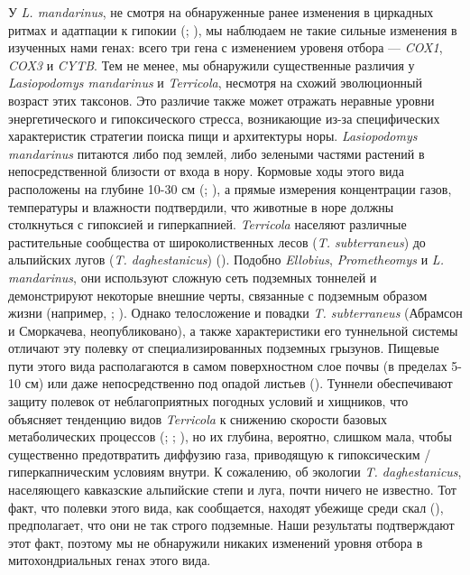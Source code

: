 У \textit{L. mandarinus}, не смотря на обнаруженные ранее изменения в циркадных ритмах и адатпации к гипокии (\cite{Sun2018}; \cite{Dong2020}), мы наблюдаем не такие сильные изменения в изученных нами генах: всего три гена с изменением уровеня отбора --- \textit{COX1}, \textit{COX3} и \textit{CYTB}. Тем не менее, мы обнаружили существенные различия у \textit{Lasiopodomys mandarinus} и \textit{Terricola}, несмотря на схожий эволюционный возраст этих таксонов. Это различие также может отражать неравные уровни энергетического и гипоксического стресса, возникающие из-за специфических характеристик стратегии поиска пищи и архитектуры норы. \textit{Lasiopodomys mandarinus} питаются либо под землей, либо зелеными частями растений в непосредственной близости от входа в нору. Кормовые ходы этого вида расположены на глубине 10-30 см (\cite{Smorkatcheva1990}; \cite{Hong2019}), а прямые измерения концентрации газов, температуры и влажности подтвердили, что животные в норе должны столкнуться с гипоксией и гиперкапнией. \textit{Terricola} населяют различные растительные сообщества от широколиственных лесов (\textit{T. subterraneus}) до альпийских лугов (\textit{T. daghestanicus}) (\cite{Aulagnier2018}). Подобно \textit{Ellobius}, \textit{Prometheomys} и \textit{L. mandarinus}, они используют сложную сеть подземных тоннелей и демонстрируют некоторые внешние черты, связанные с подземным образом жизни (например, \cite{Aulagnier2018}; \cite{Mironov2020}). Однако телосложение и повадки \textit{T. subterraneus} (Абрамсон и Сморкачева, неопубликовано), а также характеристики его туннельной системы отличают эту полевку от специализированных подземных грызунов. Пищевые пути этого вида располагаются в самом поверхностном слое почвы (в пределах 5-10 см) или даже непосредственно под опадой листьев (\cite{Mironov2020}). Туннели обеспечивают защиту полевок от неблагоприятных погодных условий и хищников, что объясняет тенденцию видов \textit{Terricola} к снижению скорости базовых метаболических процессов (\cite{Caroli2000}; \cite{Jemiolo1983}; \cite{Schropfer1977}), но их глубина, вероятно, слишком мала, чтобы существенно предотвратить диффузию газа, приводящую к гипоксическим / гиперкапническим условиям внутри. К сожалению, об экологии \textit{T. daghestanicus}, населяющего кавказские альпийские степи и луга, почти ничего не известно. Тот факт, что полевки этого вида, как сообщается, находят убежище среди скал (\cite{Krystufek2005}), предполагает, что они не так строго подземные. Наши результаты подтверждают этот факт, поэтому мы не обнаружили никаких изменений уровня отбора в митохондриальных генах этого вида. 

